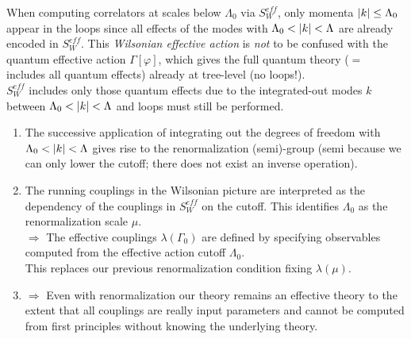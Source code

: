 When computing correlators at scales below $\Lambda_0$ via $S^{eff}_W$, only momenta $\abs{k} \leq \Lambda_0$ appear in the loops since all effects of the modes with $\Lambda_0 < \abs{k} < \Lambda$ are already encoded in $S^{eff}_W$. This \emph{Wilsonian effective action} is \emph{not} to be confused with the quantum effective action $\Gamma[\varphi]$, which gives the full quantum theory ($=$ includes all quantum effects) already at tree-level (no loops!).\\
$S^{eff}_W$ includes only those quantum effects due to the integrated-out modes $k$ between $\Lambda_0 < \abs{k} < \Lambda$ and loops must still be performed.
\begin{enumerate}
	\item The successive application of integrating out the degrees of freedom with $\Lambda_0 < \abs{k} < \Lambda$ gives rise to the renormalization (semi)-group (semi because we can only lower the cutoff; there does not exist an inverse operation).
	\item The running couplings in the Wilsonian picture are interpreted as the dependency of the couplings in $S^{eff}_W$ on the cutoff. This identifies $\Lambda_0$ as the renormalization scale $\mu$. \\
	$\Rightarrow$ The effective couplings $\lambda(\Gamma_0)$ are defined by specifying observables computed from the effective action cutoff $\Lambda_0$.\\
	This replaces our previous renormalization condition fixing $\lambda(\mu)$.
	\item $\Rightarrow$ Even with renormalization our theory remains an effective theory to the extent that all couplings are really input parameters and cannot be computed from first principles without knowing the underlying theory.
\end{enumerate}

